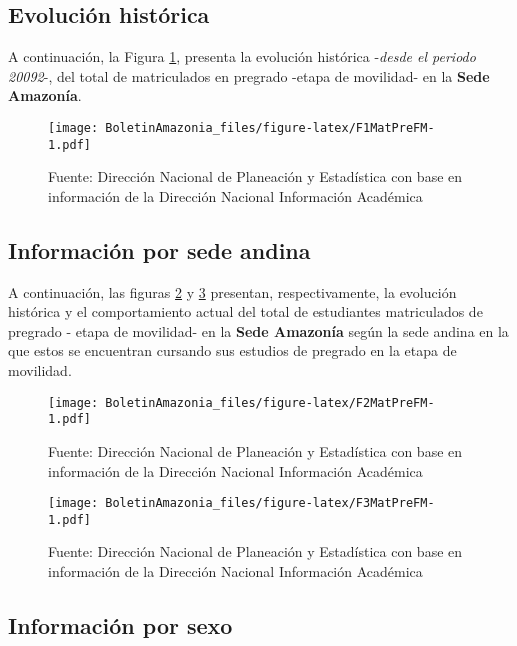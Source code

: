 \documentclass[
]{book}
\begin{document}
\hypertarget{evoluciuxf3n-histuxf3rica-6}{%
\subsection{Evolución histórica}\label{evoluciuxf3n-histuxf3rica-6}}

A continuación, la Figura \ref{fig:F1MatPreFM}, presenta la evolución histórica -\emph{desde el periodo 20092}-, del total de matriculados en pregrado -etapa de movilidad- en la \textbf{Sede Amazonía}.

\begin{figure}
\centering
\texttt{[image: BoletinAmazonia\_files/figure-latex/F1MatPreFM-1.pdf]}
\caption{\label{fig:F1MatPreFM}Fuente: Dirección Nacional de Planeación y Estadística con base en información de la Dirección Nacional Información Académica}
\end{figure}

\hypertarget{informaciuxf3n-por-sede-andina-2}{%
\subsection{Información por sede andina}\label{informaciuxf3n-por-sede-andina-2}}

A continuación, las figuras \ref{fig:F2MatPreFM} y \ref{fig:F3MatPreFM} presentan, respectivamente, la evolución histórica y el comportamiento actual del total de estudiantes matriculados de pregrado - etapa de movilidad- en la \textbf{Sede Amazonía} según la sede andina en la que estos se encuentran cursando sus estudios de pregrado en la etapa de movilidad.

\begin{figure}
\centering
\texttt{[image: BoletinAmazonia\_files/figure-latex/F2MatPreFM-1.pdf]}
\caption{\label{fig:F2MatPreFM}Fuente: Dirección Nacional de Planeación y Estadística con base en información de la Dirección Nacional Información Académica}
\end{figure}

\begin{figure}
\centering
\texttt{[image: BoletinAmazonia\_files/figure-latex/F3MatPreFM-1.pdf]}
\caption{\label{fig:F3MatPreFM}Fuente: Dirección Nacional de Planeación y Estadística con base en información de la Dirección Nacional Información Académica}
\end{figure}

\hypertarget{informaciuxf3n-por-sexo-6}{%
\subsection{Información por sexo}\label{informaciuxf3n-por-sexo-6}}
\end{document}

